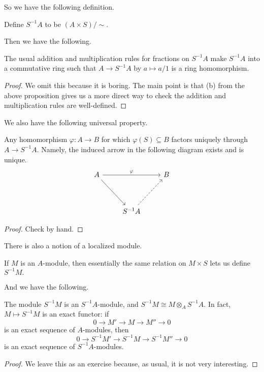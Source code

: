 So we have the following definition.
\begin{definition}
    Define $S^{-1}A$ to be $(A\times S)/\sim.$
\end{definition}
Then we have the following.
\begin{proposition}
    The usual addition and multiplication rules for fractions on $S^{-1}A$ make $S^{-1}A$ into a commutative ring such that $A\to S^{-1}A$ by $a\mapsto a/1$ is a ring homomorphism.
\end{proposition}
\begin{proof}
    We omit this because it is boring. The main point is that (b) from the above proposition gives us a more direct way to check the addition and multiplication rules are well-defined.
\end{proof}
We also have the following universal property.
\begin{proposition}
    Any homomorphism $\varphi:A\to B$ for which $\varphi(S)\subseteq B$ factors uniquely through $A\to S^{-1}A.$ Namely, the induced arrow in the following diagram exists and is unique.
    \[\begin{tikzcd}
        A && B \\
        \\
        & {S^{-1}A}
        \arrow["\varphi", from=1-1, to=1-3]
        \arrow[from=1-1, to=3-2]
        \arrow[dashed, from=3-2, to=1-3]
    \end{tikzcd}\]
\end{proposition}
\begin{proof}
    Check by hand.
\end{proof}
There is also a notion of a localized module.
\begin{definition}
    If $M$ is an $A$-module, then essentially the same relation on $M\times S$ lets us define $S^{-1}M.$
\end{definition}
And we have the following.
\begin{proposition}
    The module $S^{-1}M$ is an $S^{-1}A$-module, and $S^{-1}M\cong M\otimes_AS^{-1}A.$ In fact, $M\mapsto S^{-1}M$ is an exact functor: if
    \[0\to M'\to M\to M''\to 0\]
    is an exact sequence of $A$-modules, then
    \[0\to S^{-1}M'\to S^{-1}M\to S^{-1}M''\to0\]
    is an exact sequence of $S^{-1}A$-modules.
\end{proposition}
\begin{proof}
    We leave this as an exercise because, as usual, it is not very interesting.
\end{proof}

